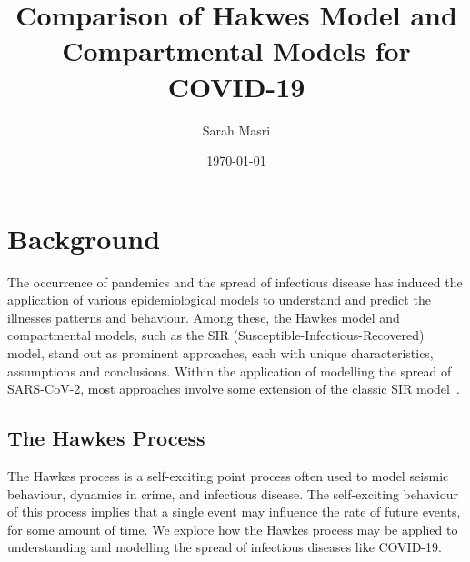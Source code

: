 \documentclass[12pt]{article}
\title{Comparison of Hakwes Model and Compartmental Models for COVID-19}
\author{Sarah Masri}
\date{\today}
\begin{document}
\maketitle


\thispagestyle{empty}

\begin{abstract}
\noindent  
\end{abstract}





\pagebreak
\section{Background}


The occurrence of pandemics and the spread of infectious disease has induced the application of various epidemiological models to understand and predict the illnesses patterns and behaviour. Among these, the Hawkes model and compartmental models, such as the SIR (Susceptible-Infectious-Recovered) model, stand out as prominent approaches, each with unique characteristics, assumptions and conclusions. Within the application of modelling the spread of SARS-CoV-2, most approaches involve some extension of the classic SIR model~\cite{Garetto2021}.



\subsection{The Hawkes Process}

The Hawkes process is a self-exciting point process often used to model seismic behaviour, dynamics in crime, and infectious disease. The self-exciting behaviour of this process implies that a single event may influence the rate of future events, for some amount of time. We explore how the Hawkes process may be applied to understanding and modelling the spread of infectious diseases like COVID-19. 
\end{document}
